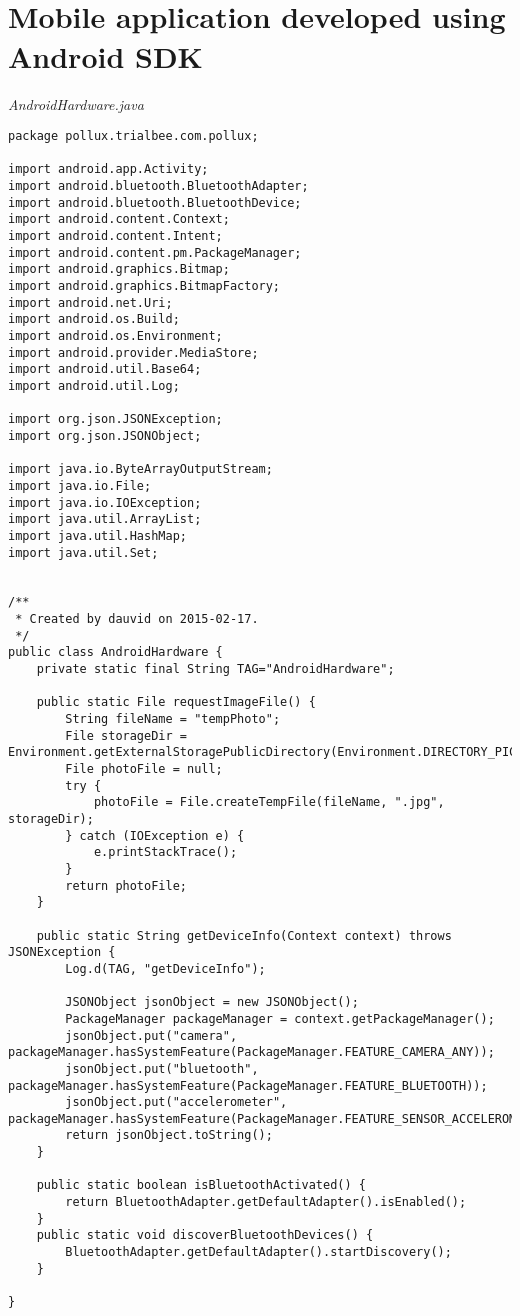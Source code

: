 \newpage
\appendix
\section{\\ Mobile application developed using Android SDK} \label{App:AppendixA}

\emph{AndroidHardware.java}
\begin{lstlisting}
package pollux.trialbee.com.pollux;

import android.app.Activity;
import android.bluetooth.BluetoothAdapter;
import android.bluetooth.BluetoothDevice;
import android.content.Context;
import android.content.Intent;
import android.content.pm.PackageManager;
import android.graphics.Bitmap;
import android.graphics.BitmapFactory;
import android.net.Uri;
import android.os.Build;
import android.os.Environment;
import android.provider.MediaStore;
import android.util.Base64;
import android.util.Log;

import org.json.JSONException;
import org.json.JSONObject;

import java.io.ByteArrayOutputStream;
import java.io.File;
import java.io.IOException;
import java.util.ArrayList;
import java.util.HashMap;
import java.util.Set;


/**
 * Created by dauvid on 2015-02-17.
 */
public class AndroidHardware {
    private static final String TAG="AndroidHardware";

    public static File requestImageFile() {
        String fileName = "tempPhoto";
        File storageDir = Environment.getExternalStoragePublicDirectory(Environment.DIRECTORY_PICTURES);
        File photoFile = null;
        try {
            photoFile = File.createTempFile(fileName, ".jpg", storageDir);
        } catch (IOException e) {
            e.printStackTrace();
        }
        return photoFile;
    }

    public static String getDeviceInfo(Context context) throws JSONException {
        Log.d(TAG, "getDeviceInfo");

        JSONObject jsonObject = new JSONObject();
        PackageManager packageManager = context.getPackageManager();
        jsonObject.put("camera", packageManager.hasSystemFeature(PackageManager.FEATURE_CAMERA_ANY));
        jsonObject.put("bluetooth", packageManager.hasSystemFeature(PackageManager.FEATURE_BLUETOOTH));
        jsonObject.put("accelerometer", packageManager.hasSystemFeature(PackageManager.FEATURE_SENSOR_ACCELEROMETER));
        return jsonObject.toString();
    }

    public static boolean isBluetoothActivated() {
        return BluetoothAdapter.getDefaultAdapter().isEnabled();
    }
    public static void discoverBluetoothDevices() {
        BluetoothAdapter.getDefaultAdapter().startDiscovery();
    }

}
\end{lstlisting}

